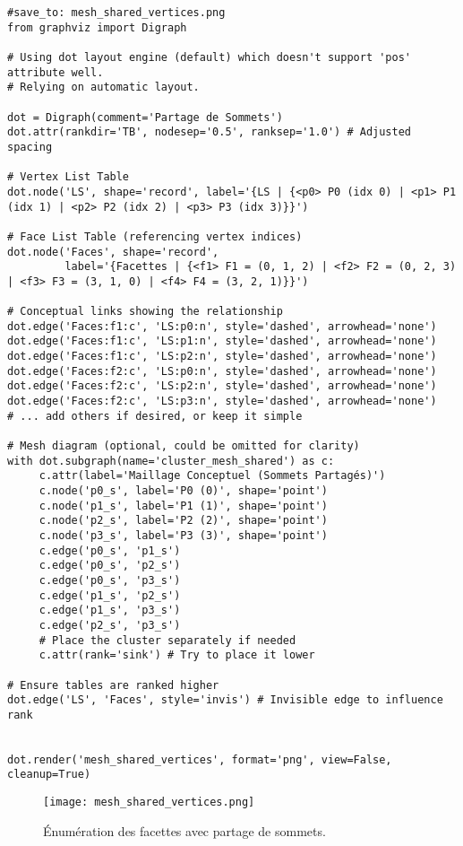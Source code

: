 \documentclass{article}
\begin{document}
\begin{verbatim}
#save_to: mesh_shared_vertices.png
from graphviz import Digraph

# Using dot layout engine (default) which doesn't support 'pos' attribute well.
# Relying on automatic layout.

dot = Digraph(comment='Partage de Sommets')
dot.attr(rankdir='TB', nodesep='0.5', ranksep='1.0') # Adjusted spacing

# Vertex List Table
dot.node('LS', shape='record', label='{LS | {<p0> P0 (idx 0) | <p1> P1 (idx 1) | <p2> P2 (idx 2) | <p3> P3 (idx 3)}}')

# Face List Table (referencing vertex indices)
dot.node('Faces', shape='record',
         label='{Facettes | {<f1> F1 = (0, 1, 2) | <f2> F2 = (0, 2, 3) | <f3> F3 = (3, 1, 0) | <f4> F4 = (3, 2, 1)}}')

# Conceptual links showing the relationship
dot.edge('Faces:f1:c', 'LS:p0:n', style='dashed', arrowhead='none')
dot.edge('Faces:f1:c', 'LS:p1:n', style='dashed', arrowhead='none')
dot.edge('Faces:f1:c', 'LS:p2:n', style='dashed', arrowhead='none')
dot.edge('Faces:f2:c', 'LS:p0:n', style='dashed', arrowhead='none')
dot.edge('Faces:f2:c', 'LS:p2:n', style='dashed', arrowhead='none')
dot.edge('Faces:f2:c', 'LS:p3:n', style='dashed', arrowhead='none')
# ... add others if desired, or keep it simple

# Mesh diagram (optional, could be omitted for clarity)
with dot.subgraph(name='cluster_mesh_shared') as c:
     c.attr(label='Maillage Conceptuel (Sommets Partagés)')
     c.node('p0_s', label='P0 (0)', shape='point')
     c.node('p1_s', label='P1 (1)', shape='point')
     c.node('p2_s', label='P2 (2)', shape='point')
     c.node('p3_s', label='P3 (3)', shape='point')
     c.edge('p0_s', 'p1_s')
     c.edge('p0_s', 'p2_s')
     c.edge('p0_s', 'p3_s')
     c.edge('p1_s', 'p2_s')
     c.edge('p1_s', 'p3_s')
     c.edge('p2_s', 'p3_s')
     # Place the cluster separately if needed
     c.attr(rank='sink') # Try to place it lower

# Ensure tables are ranked higher
dot.edge('LS', 'Faces', style='invis') # Invisible edge to influence rank


dot.render('mesh_shared_vertices', format='png', view=False, cleanup=True)
\end{verbatim}

\begin{figure}[H]
\centering
\texttt{[image: mesh\_shared\_vertices.png]} %
\caption{Énumération des facettes avec partage de sommets.}
\label{fig:mesh_shared_vertices}
\end{figure}
\end{document}
